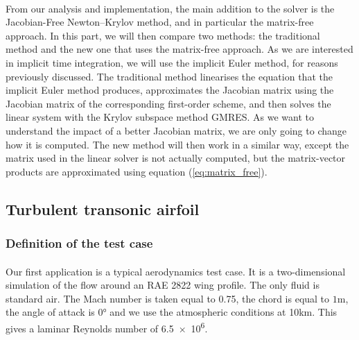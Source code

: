     \paragraph{}
    From our analysis and implementation, the main addition to the solver is the Jacobian-Free Newton--Krylov method, and in particular the matrix-free approach.
    In this part, we will then compare two methods: the traditional method and the new one that uses the matrix-free approach.
    As we are interested in implicit time integration, we will use the implicit Euler method, for reasons previously discussed.
    The traditional method linearises the equation that the implicit Euler method produces, approximates the Jacobian matrix using the Jacobian matrix of the corresponding first-order scheme, and then solves the linear system with the Krylov subspace method GMRES.
    As we want to understand the impact of a better Jacobian matrix, we are only going to change how it is computed.
    The new method will then work in a similar way, except the matrix used in the linear solver is not actually computed, but the matrix-vector products are approximated using equation (\ref{eq:matrix_free}).


    \subsection{Turbulent transonic airfoil}

      \subsubsection{Definition of the test case}

        \paragraph{}
        Our first application is a typical aerodynamics test case.
        It is a two-dimensional simulation of the flow around an RAE 2822 wing profile.
        The only fluid is standard air.
        The Mach number is taken equal to 0.75, the chord is equal to $1\si{\meter}$, the angle of attack is $0\si{\degree}$ and we use the atmospheric conditions at 10km.
        This gives a laminar Reynolds number of \num{6.5e6}.

